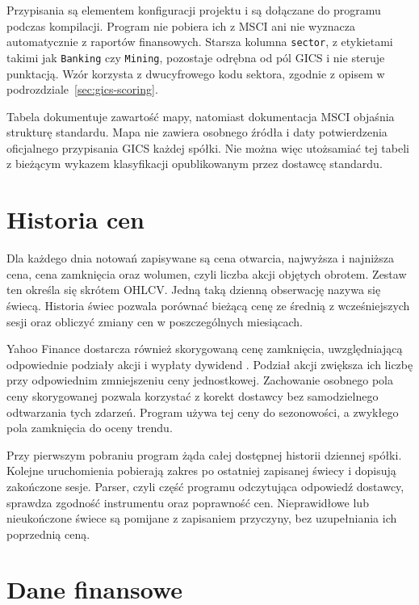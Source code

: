 \documentclass[12pt,a4paper,twoside]{report}
\begin{document}
Przypisania są elementem konfiguracji projektu i są dołączane do programu podczas kompilacji. Program nie pobiera ich z MSCI ani nie wyznacza automatycznie z raportów finansowych. Starsza kolumna \texttt{sector}, z etykietami takimi jak \texttt{Banking} czy \texttt{Mining}, pozostaje odrębna od pól GICS i nie steruje punktacją. Wzór korzysta z dwucyfrowego kodu sektora, zgodnie z opisem w podrozdziale~\ref{sec:gics-scoring}.

Tabela dokumentuje zawartość mapy, natomiast dokumentacja MSCI objaśnia strukturę standardu. Mapa nie zawiera osobnego źródła i daty potwierdzenia oficjalnego przypisania GICS każdej spółki. Nie można więc utożsamiać tej tabeli z bieżącym wykazem klasyfikacji opublikowanym przez dostawcę standardu.


\section{Historia cen}

Dla każdego dnia notowań zapisywane są cena otwarcia, najwyższa i najniższa cena, cena zamknięcia oraz wolumen, czyli liczba akcji objętych obrotem. Zestaw ten określa się skrótem OHLCV. Jedną taką dzienną obserwację nazywa się świecą. Historia świec pozwala porównać bieżącą cenę ze średnią z wcześniejszych sesji oraz obliczyć zmiany cen w poszczególnych miesiącach.

Yahoo Finance dostarcza również skorygowaną cenę zamknięcia, uwzględniającą odpowiednie podziały akcji i wypłaty dywidend \cite{yahoo}. Podział akcji zwiększa ich liczbę przy odpowiednim zmniejszeniu ceny jednostkowej. Zachowanie osobnego pola ceny skorygowanej pozwala korzystać z korekt dostawcy bez samodzielnego odtwarzania tych zdarzeń. Program używa tej ceny do sezonowości, a zwykłego pola zamknięcia do oceny trendu.

Przy pierwszym pobraniu program żąda całej dostępnej historii dziennej spółki. Kolejne uruchomienia pobierają zakres po ostatniej zapisanej świecy i dopisują zakończone sesje. Parser, czyli część programu odczytująca odpowiedź dostawcy, sprawdza zgodność instrumentu oraz poprawność cen. Nieprawidłowe lub nieukończone świece są pomijane z zapisaniem przyczyny, bez uzupełniania ich poprzednią ceną.

\section{Dane finansowe}
\end{document}

